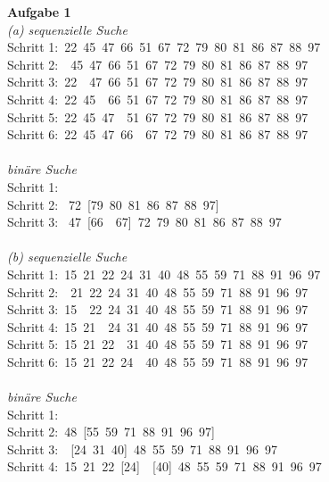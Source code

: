 \documentclass[12pt,a4paper]{article}
\begin{document}
\noindent \textbf{Aufgabe 1} \\
\textit{(a) sequenzielle Suche}\\
\indent Schritt 1:\quad {}\ 22\ 45\ 47\ 66\ 51\ 67\ 72\ 79\ 80\ 81\ 86\ 87\ 88\ 97\\
\indent Schritt 2:\ \ 45\ 47\ 66\ 51\ 67\ 72\ 79\ 80\ 81\ 86\ 87\ 88\ 97\\
\indent Schritt 3:\ 22\ \ 47\ 66\ 51\ 67\ 72\ 79\ 80\ 81\ 86\ 87\ 88\ 97\\
\indent Schritt 4:\ 22\ 45\ \ 66\ 51\ 67\ 72\ 79\ 80\ 81\ 86\ 87\ 88\ 97\\
\indent Schritt 5:\ 22\ 45\ 47\ \ 51\ 67\ 72\ 79\ 80\ 81\ 86\ 87\ 88\ 97\\
\indent Schritt 6:\ 22\ 45\ 47\ 66\ \ 67\ 72\ 79\ 80\ 81\ 86\ 87\ 88\ 97\\
\\
\indent \textit{bin\"are Suche} \\
\indent Schritt 1: \quad [11\ 22\ 45\ 47\ 66\ 51\ 67\ \fbox{72}\ 79\ 80\ 81\ 86\ 87\ 88\ 97]\\
\indent Schritt 2: \quad [11\ 22\ 45\ \fbox{47}\ 66\ 51\ 67]\ 72\ [79\ 80\ 81\ 86\ 87\ 88\ 97]\\
\indent Schritt 3: \quad [11\ 22\ 45]\ 47\ [66\ \ 67]\ 72\ 79\ 80\ 81\ 86\ 87\ 88\ 97\\
\\
\textit{(b) sequenzielle Suche}\\
\indent Schritt 1:\quad {}\ 15\ 21\ 22\ 24\ 31\ 40\ 48\ 55\ 59\ 71\ 88\ 91\ 96\ 97\\
\indent Schritt 2:\ \ 21\ 22\ 24\ 31\ 40\ 48\ 55\ 59\ 71\ 88\ 91\ 96\ 97\\
\indent Schritt 3:\ 15\ \ 22\ 24\ 31\ 40\ 48\ 55\ 59\ 71\ 88\ 91\ 96\ 97\\
\indent Schritt 4:\ 15\ 21\ \ 24\ 31\ 40\ 48\ 55\ 59\ 71\ 88\ 91\ 96\ 97\\
\indent Schritt 5:\ 15\ 21\ 22\ \ 31\ 40\ 48\ 55\ 59\ 71\ 88\ 91\ 96\ 97\\
\indent Schritt 6:\ 15\ 21\ 22\ 24\ \ 40\ 48\ 55\ 59\ 71\ 88\ 91\ 96\ 97\\
\\
\indent \textit{bin\"are Suche} \\
\indent Schritt 1:\quad [12\ 15\ 21\ 22\ 24\ 31\ 40\ \fbox{48}\ 55\ 59\ 71\ 88\ 91\ 96\ 97]\\
\indent Schritt 2:\quad [12\ 15\ 21\ \fbox{22}\ 24\ 31\ 40]\ 48\ [55\ 59\ 71\ 88\ 91\ 96\ 97]\\
\indent Schritt 3:\quad [12\ 15\ 21]\ \ [24\ 31\ 40]\ 48\ 55\ 59\ 71\ 88\ 91\ 96\ 97\\
\indent Schritt 4:\ 15\ 21\ 22\ [24]\ \ [40]\ 48\ 55\ 59\ 71\ 88\ 91\ 96\ 97\\
\end{document}
